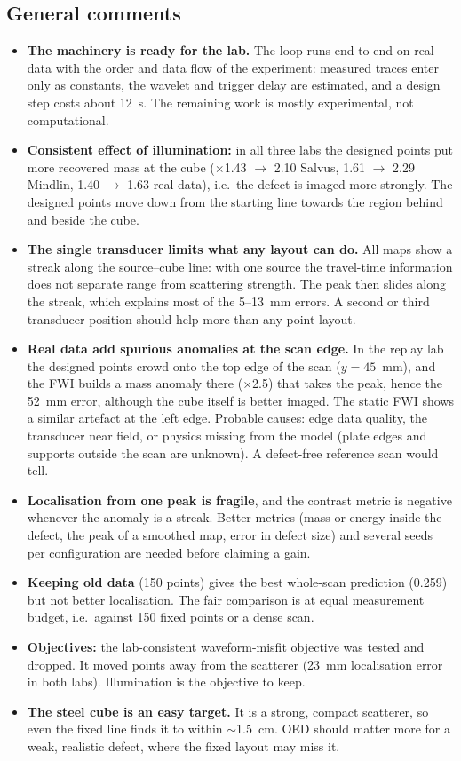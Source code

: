 \documentclass[11pt,a4paper]{article}
\begin{document}
\subsection{General comments}
\begin{itemize}
  \item \textbf{The machinery is ready for the lab.} The loop runs end to end on real data with the order and data flow
        of the experiment: measured traces enter only as constants, the wavelet and trigger delay are estimated, and
        a design step costs about 12~s. The remaining work is mostly experimental, not computational.
  \item \textbf{Consistent effect of illumination:} in all three labs the designed points put more recovered mass at the
        cube ($\times$1.43 $\to$ 2.10 Salvus, 1.61 $\to$ 2.29 Mindlin, 1.40 $\to$ 1.63 real data), i.e.\ the defect is
        imaged more strongly. The designed points move down from the starting line towards the region behind and
        beside the cube.
  \item \textbf{The single transducer limits what any layout can do.} All maps show a streak along the source--cube
        line: with one source the travel-time information does not separate range from scattering strength. The peak
        then slides along the streak, which explains most of the 5--13~mm errors. A second or third transducer position
        should help more than any point layout.
  \item \textbf{Real data add spurious anomalies at the scan edge.} In the replay lab the designed points crowd onto the
        top edge of the scan ($y=45$~mm), and the FWI builds a mass anomaly there ($\times$2.5) that takes the peak,
        hence the 52~mm error, although the cube itself is better imaged. The static FWI shows a similar artefact at the
        left edge. Probable causes: edge data quality, the transducer near field, or physics missing from the model
        (plate edges and supports outside the scan are unknown). A defect-free reference scan would tell.
  \item \textbf{Localisation from one peak is fragile}, and the contrast metric is negative whenever the anomaly is a
        streak. Better metrics (mass or energy inside the defect, the peak of a smoothed map, error in defect size) and
        several seeds per configuration are needed before claiming a gain.
  \item \textbf{Keeping old data} (150 points) gives the best whole-scan prediction (0.259) but not better localisation.
        The fair comparison is at equal measurement budget, i.e.\ against 150 fixed points or a dense scan.
  \item \textbf{Objectives:} the lab-consistent waveform-misfit objective was tested and dropped. It moved points away
        from the scatterer (23~mm localisation error in both labs). Illumination is the objective to keep.
  \item \textbf{The steel cube is an easy target.} It is a strong, compact scatterer, so even the fixed line finds it to
        within $\sim$1.5~cm. OED should matter more for a weak, realistic defect, where the fixed layout may miss it.
\end{itemize}
\end{document}
